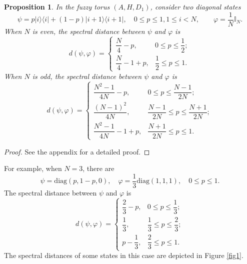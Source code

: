 \documentclass[a4paper,11pt]{article}
\newtheorem{proposition}{Proposition}
\begin{document}
\begin{proposition}\label{pr2}
  In the fuzzy torus $(A, H, D_1)$, consider two diagonal states
  \begin{equation}
    \psi = p|i \rangle \langle i|+(1-p)|i+1 \rangle \langle i+1|, \quad 0 \leqslant p\leqslant1,1\leqslant i< N, \qquad \varphi
    = \frac{1}{N} \mathbb{I}_N.
  \end{equation}
  When $N$ is even, the spectral distance between $\psi$ and $\varphi$ is
  \begin{equation}
    d (\psi, \varphi) = \left\{ \begin{array}{ll}
      \dfrac{N}{4} - p, & 0 \leqslant p
      \leqslant \dfrac{1}{2} ;\\[1em]
      \dfrac{N}{4} - 1 + p , & \dfrac{1}{2}
      \leqslant p \leqslant 1.
    \end{array} \right.
  \end{equation}
  When $N$ is odd, the spectral distance between $\psi$ and $\varphi$ is
  \begin{equation}
    d (\psi, \varphi) = \left\{ \begin{array}{ll}
      \dfrac{N^2 - 1}{4 N} - p , & 0
      \leqslant p \leqslant \dfrac{N - 1}{2 N} ;\\[1em]
      \dfrac{(N - 1)^2}{4 N}, & \dfrac{N - 1}{2 N} \leqslant
      p \leqslant \dfrac{N + 1}{2 N} ;\\[.5em]
      \dfrac{N^2 - 1}{4 N} - 1 + p , &
      \dfrac{N + 1}{2 N} \leqslant p \leqslant 1.
    \end{array} \right.
  \end{equation}
\end{proposition}
\begin{proof}
	See the appendix for a detailed proof. 
\end{proof}
For example, when $N = 3$,
there are
\begin{equation}
  \psi = \mathrm{diag} (p, 1 - p, 0), \quad \varphi = \frac{1}{3}
  \mathrm{diag} (1, 1, 1), \quad 0 \leqslant p \leqslant 1.
\end{equation}
The spectral distance between $\psi$ and $\varphi$ is
\begin{equation}
  d (\psi, \varphi) = \left\{ \begin{array}{ll}
    \dfrac{2}{3} - p , & 0 \leqslant p
    \leqslant \dfrac{1}{3} ;\\[1em]
     \dfrac{1}{3}, & \dfrac{1}{3} \leqslant p \leqslant
    \dfrac{2}{3} ;\\[1em]
    p - \dfrac{1}{3}, & \dfrac{2}{3}
    \leqslant p \leqslant 1.
  \end{array} \right.
\end{equation}
The spectral distances of some states in this case are depicted in Figure \ref{fig1}.
\end{document}
